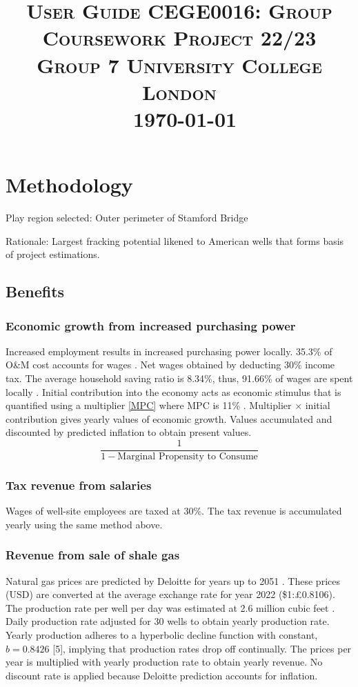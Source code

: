 \documentclass[10pt]{article}
\title{
    \textsc{\huge User Guide }\hfill \textsc{\small CEGE0016: Group Coursework Project 22/23 }\\%
    \textsc{\large Group 7} \hfill \textsc{\small University College London }\\
    \ \hfill \textsc{\small \today }\\
}
\date{}
\begin{document}
\maketitle
\section{Methodology}
Play region selected: Outer perimeter of Stamford Bridge 

Rationale: Largest fracking potential likened to American wells that forms basis of project estimations. 
\subsection{Benefits}
\subsubsection{Economic growth from increased purchasing power}
Increased employment results in increased purchasing power locally. 35.3\% of O\&M cost accounts for wages \cite{001}. Net wages obtained by deducting 30\% income tax. The average household saving ratio is 8.34\%, thus, 91.66\% of wages are spent locally \cite{002}. Initial contribution into the economy acts as economic stimulus that is quantified using a multiplier \eqref{MPC} where MPC is 11\% \cite{003}. Multiplier $\times$ initial contribution gives yearly values of economic growth. Values accumulated and discounted by predicted inflation to obtain present values.
\begin{equation}\label{MPC}
    \frac{1}{1 - \textrm{Marginal Propensity to Consume}}
\end{equation}
\subsubsection{Tax revenue from salaries}
Wages of well-site employees are taxed \cite{004} at 30\%. The tax revenue is accumulated yearly using the same method above.
\subsubsection{Revenue from sale of shale gas}
Natural gas prices are predicted by Deloitte for years up to 2051 \cite{005}. These prices (USD) are converted at the average exchange rate for year 2022 (\$1:\pounds0.8106). The production rate per well per day was estimated at 2.6 million cubic feet \cite{006}. Daily production rate adjusted for 30 wells to obtain yearly production rate. Yearly production adheres to a hyperbolic decline function with constant, $b = 0.8426$ [5], implying that production rates drop off continually. The prices per year is multiplied with yearly production rate to obtain yearly revenue. No discount rate is applied because Deloitte prediction accounts for inflation. 
\end{document}
